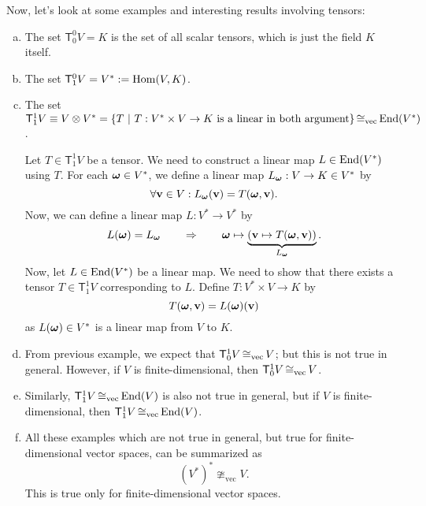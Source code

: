 \begin{example}
    Now, let's look at some examples and interesting results involving tensors:
    \begin{enumerate}[(a)]
        \item The set \(\mathsf{T}^0_0 V = K\) is the set of all scalar tensors, which is just the field \(K\) itself.
        \item The set \(\mathsf{T}^0_1 V = V^* := \operatorname{Hom}(V, K)\).
        \item The set \(\mathsf{T}^1_1 V \equiv V \otimes V^* = \qty{T \ \middle|\ T: V^* \times V \to K \text{ is a linear in both argument}} \operatorname{\cong_{\text{vec}}} \operatorname{End}(V^*)\).

              \begin{Proof}
                  Let \(T \in \mathsf{T}^1_1 V\) be a tensor. We need to construct a linear map \(L \in \operatorname{End}(V^*)\) using \(T\). For each \(\vb*{\omega} \in V^*\), we define a linear map \(L_{\vb*{\omega}}: V \to K \in V^*\) by
                  \begin{equation}
                      \forall \vb{v} \in V: L_{\vb*{\omega}}(\vb{v}) = T(\vb*{\omega}, \vb{v}).
                  \end{equation}
                  Now, we can define a linear map \(L: V^* \to V^*\) by
                  \begin{equation}
                      L(\vb*{\omega}) = L_{\vb*{\omega}} \qquad \Rightarrow \qquad \vb*{\omega} \mapsto \underbrace{(\vb{v} \mapsto T(\vb*{\omega}, \vb{v}))}_{L_{\vb*{\omega}}}.
                  \end{equation}
                  Now, let \(L \in \operatorname{End}(V^*)\) be a linear map. We need to show that there exists a tensor \(T \in \mathsf{T}^1_1 V\) corresponding to \(L\).
                  Define \(T: V^* \times V \to K\) by
                  \begin{equation}
                      T(\vb*{\omega}, \vb{v}) = L(\vb*{\omega})(\vb{v})
                  \end{equation}
                  as \(L(\vb*{\omega}) \in V^*\) is a linear map from \(V\) to \(K\).
              \end{Proof}

        \item From previous example, we expect that \(\mathsf{T}^1_0 V \operatorname{\cong_{\text{vec}}} V\); but this is not true in general. However, if \(V\) is finite-dimensional, then \(\mathsf{T}^1_0 V \operatorname{\cong_{\text{vec}}} V\).

        \item Similarly, \(\mathsf{T}^1_1 V \operatorname{\cong_{\text{vec}}} \operatorname{End}(V)\) is also not true in general, but if \(V\) is finite-dimensional, then \(\mathsf{T}^1_1 V \operatorname{\cong_{\text{vec}}} \operatorname{End}(V)\).

        \item All these examples which are not true in general, but true for finite-dimensional vector spaces, can be summarized as
              \begin{equation}
                  (V^*)^* \ncong_{\text{vec}} V.
              \end{equation}
              This is true only for finite-dimensional vector spaces.
    \end{enumerate}
\end{example}

